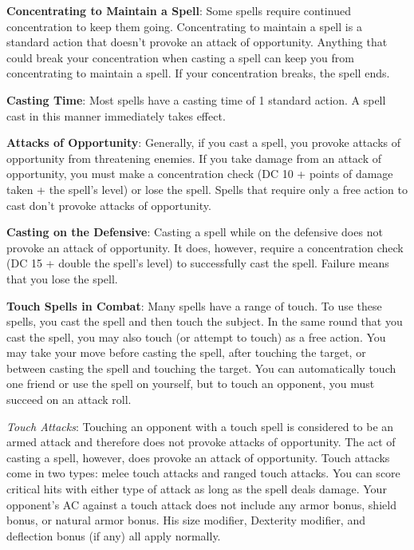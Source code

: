 \textbf{Concentrating to Maintain a Spell}: Some spells require continued concentration to keep them going. Concentrating to maintain a spell is a standard action that doesn't provoke an attack of opportunity. Anything that could break your concentration when casting a spell can keep you from concentrating to maintain a spell. If your concentration breaks, the spell ends.
				
\textbf{Casting Time}: Most spells have a casting time of 1 standard action. A spell cast in this manner immediately takes effect.
				
\textbf{Attacks of Opportunity}: Generally, if you cast a spell, you provoke attacks of opportunity from threatening enemies. If you take damage from an attack of opportunity, you must make a concentration check (DC 10 + points of damage taken + the spell's level) or lose the spell. Spells that require only a free action to cast don't provoke attacks of opportunity.
				
\textbf{Casting on the Defensive}: Casting a spell while on the defensive does not provoke an attack of opportunity. It does, however, require a concentration check (DC 15 + double the spell's level) to successfully cast the spell. Failure means that you lose the spell.
				
\textbf{Touch Spells in Combat}: Many spells have a range of touch. To use these spells, you cast the spell and then touch the subject. In the same round that you cast the spell, you may also touch (or attempt to touch) as a free action. You may take your move before casting the spell, after touching the target, or between casting the spell and touching the target. You can automatically touch one friend or use the spell on yourself, but to touch an opponent, you must succeed on an attack roll.
				
\textit{Touch Attacks}: Touching an opponent with a touch spell is considered to be an armed attack and therefore does not provoke attacks of opportunity. The act of casting a spell, however, does provoke an attack of opportunity. Touch attacks come in two types: melee touch attacks and ranged touch attacks. You can score critical hits with either type of attack as long as the spell deals damage. Your opponent's AC against a touch attack does not include any armor bonus, shield bonus, or natural armor bonus. His size modifier, Dexterity modifier, and deflection bonus (if any) all apply normally.
				
